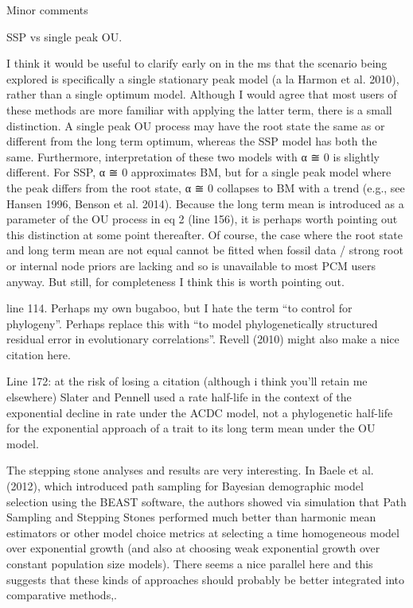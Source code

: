 \documentclass[11pt]{letter}
\begin{document}
\begin{letter}{}
Minor comments

SSP vs single peak OU.

I think it would be useful to clarify early on in the ms that the scenario being explored is specifically a single stationary peak model (a la Harmon et al. 2010), rather than a single optimum model. Although I would agree that most users of these methods are more familiar with applying the latter term, there is a small distinction. A single peak OU process may have the root state the same as or different from the long term optimum, whereas the SSP model has both the same. Furthermore, interpretation of these two models with α ≅ 0 is slightly different. For SSP, α ≅ 0 approximates BM, but for a single peak model where the peak differs from the root state, α ≅ 0 collapses to BM with a trend (e.g., see Hansen 1996, Benson et al. 2014). Because the long term mean is introduced as a parameter of the OU process in eq 2 (line 156), it is perhaps worth pointing out this distinction at some point thereafter. Of course, the case where the root state and long term mean are not equal cannot be fitted when fossil data / strong root or internal node priors are lacking and so is unavailable to most PCM users anyway. But still, for completeness I think this is worth pointing out.

line 114. Perhaps my own bugaboo, but I hate the term “to control for phylogeny”. Perhaps replace this with “to model phylogenetically structured residual error in evolutionary correlations”. Revell (2010) might also make a nice citation here.

Line 172: at the risk of losing a citation (although i think you’ll retain me elsewhere) Slater and Pennell used a rate half-life in the context of the exponential decline in rate under the ACDC model, not a phylogenetic half-life for the exponential approach of a trait to its long term mean under the OU model.

The stepping stone analyses and results are very interesting. In Baele et al. (2012), which introduced path sampling for Bayesian demographic model selection using the BEAST software, the authors showed via simulation that Path Sampling and Stepping Stones performed much better than harmonic mean estimators or other model choice metrics at selecting a time homogeneous model over exponential growth (and also at choosing weak exponential growth over constant population size models). There seems a nice parallel here and this suggests that these kinds of approaches should probably be better integrated into comparative methods,.


\end{letter}
\end{document}
